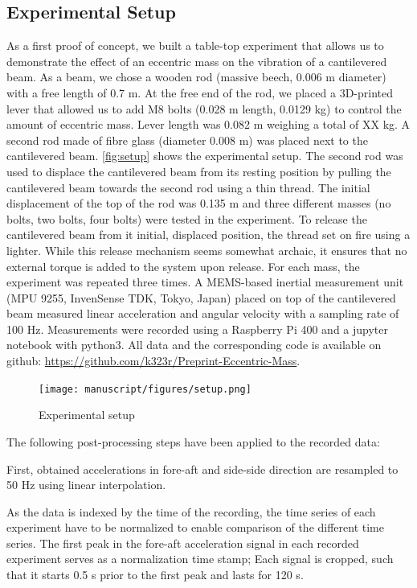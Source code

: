 \documentclass{article}
\begin{document}
\subsection{Experimental Setup}

As a first proof of concept, we built a table-top experiment that allows us to demonstrate the effect of an eccentric mass on the vibration of a cantilevered beam. As a beam, we chose a wooden rod (massive beech, 0.006 m diameter) with a free length of 0.7 m. At the free end of the rod, we placed a 3D-printed lever that allowed us to add M8 bolts (0.028 m length, 0.0129 kg) to control the amount of eccentric mass. Lever length was 0.082 m weighing a total of XX kg. A second rod made of fibre glass (diameter 0.008 m) was placed next to the cantilevered beam. \autoref{fig:setup} shows the experimental setup. The second rod was used to displace the cantilevered beam from its resting position  by pulling the cantilevered beam towards the second rod using a thin thread. The initial displacement of the top of the rod was 0.135 m and three different masses (no bolts, two bolts, four bolts) were tested in the experiment. To release the cantilevered beam from it initial, displaced position, the thread set on fire using a lighter. While this release mechanism seems somewhat archaic, it ensures that no external torque is added to the system upon release. For each mass, the experiment was repeated three times. A MEMS-based inertial measurement unit (MPU 9255, InvenSense TDK, Tokyo, Japan) placed on top of the cantilevered beam measured linear acceleration and angular velocity with a sampling rate of 100 Hz. Measurements were recorded using a Raspberry Pi 400 and a jupyter notebook with python3. All data and the corresponding code is available on github: \url{https://github.com/k323r/Preprint-Eccentric-Mass}.

\begin{figure}[ht!]
    \centering
    \texttt{[image: manuscript/figures/setup.png]}
    \caption{Experimental setup}
    \label{fig:setup}
\end{figure}

The following post-processing steps have been applied to the recorded data:

First, obtained accelerations in fore-aft and side-side direction are resampled to 50 Hz using linear interpolation. 

As the data is indexed by the time of the recording, the time series of each experiment have to be normalized to enable comparison of the different time series. The first peak in the fore-aft acceleration signal in each recorded experiment serves as a normalization time stamp; Each signal is cropped, such that it starts 0.5 s prior to the first peak and lasts for 120 s. 
\end{document}
